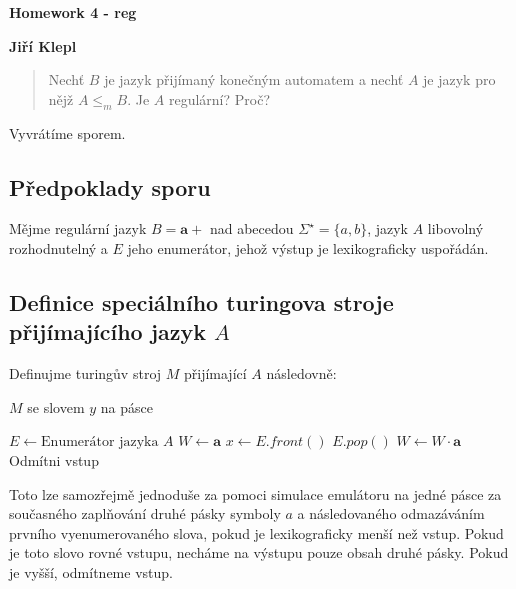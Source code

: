 \documentclass[a4paper,12pt]{article} %
\begin{document}
\thispagestyle{empty} %

\begin{center}
    {\Large \bf Homework 4 - reg}
    \vspace{2mm}

    {\bf Jiří Klepl}

\end{center}

\vspace{0.4cm}


\begin{quote}
    Nechť $B$ je jazyk přijímaný konečným automatem a nechť $A$ je jazyk pro nějž $A \leq_m B$. Je $A$ regulární? Proč?
\end{quote}

Vyvrátíme sporem.

\subsection*{Předpoklady sporu}

Mějme regulární jazyk $B = \mathbf{a}+$ nad abecedou $\Sigma^\star = \{a, b\}$, jazyk $A$ libovolný rozhodnutelný a $E$ jeho enumerátor, jehož výstup je lexikograficky uspořádán.

\subsection*{Definice speciálního turingova stroje přijímajícího jazyk $A$}

Definujme turingův stroj $M$ přijímající $A$ následovně:
\begin{algorithm}
    \caption{$M$ se slovem $y$ na pásce}
    \begin{algorithmic}[1]
        \State $E \gets \text{Enumerátor jazyka }  A$
        \State $W \gets \mathbf{a}$
        \State $x \gets E.front()$
        \State $E.pop()$
        \State $W \gets W \cdot \mathbf{a}$
        \State {}
        \Else
        \State \Return Odmítni vstup
        \EndIf
        \EndWhile
    \end{algorithmic}
\end{algorithm}

Toto lze samozřejmě jednoduše za pomoci simulace emulátoru na jedné pásce za současného zaplňování druhé pásky symboly $a$ a následovaného odmazáváním prvního vyenumerovaného slova, pokud je lexikograficky menší než vstup. Pokud je toto slovo rovné vstupu, necháme na výstupu pouze obsah druhé pásky. Pokud je vyšší, odmítneme vstup.
\end{document}
